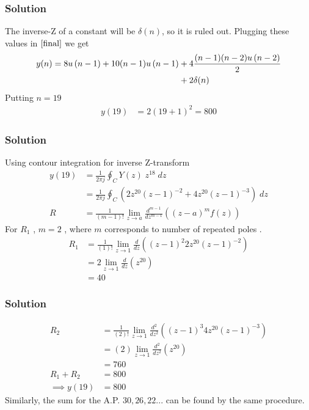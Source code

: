 \documentclass{beamer}
\providecommand{\brak}[1]{\ensuremath{\left(#1\right)}}
\theoremstyle{remark}
\begin{document}
\begin{frame}
\frametitle{Solution}
The inverse-Z of a constant will be $\delta(n)$, so it is ruled out.
Plugging these values in $\eqref{final}$ we get
\begin{align}
   y(n) = 8u\brak{n-1} + 10(n-1)u\brak{n-1} &+ 4\frac{(n-1)(n-2)u\brak{n-2}}{2} \notag \\
   &+ 2\delta(n)
\end{align}
Putting $n=19$
\begin{align}
      y(19) &= 2(19+1)^2 = 800
\end{align}
    
\end{frame}







\begin{frame}
\frametitle{Solution}
Using contour integration for inverse Z-transform
\begin{align}
    y(19)&=\frac{1}{2\pi j}\oint_{C}Y(z) \;z^{18} \;dz\\  
 &=\frac{1}{2\pi j}\oint_{C}\brak{2z^{20}\brak{z-1}^{-2}+
       4z^{20}\brak{z-1}^{-3}} \;dz\\
       R&=\frac{1}{\brak {m-1}!}\lim\limits_{z\to a}\frac{d^{m-1}}{dz^{m-1}}\brak {{(z-a)}^{m}f\brak z}\label{eq:6}  
\end{align}
For $R_1$ , $m=2$ , where $m$ corresponds to number of repeated poles .
\begin{align}
    R_1 &=\frac{1}{\brak {1}!}\lim\limits_{z\to 1}\frac{d}{dz}\brak {{(z-1)}^{2}2z^{20}\brak{z-1}^{-2}}   \\
    &=2\lim\limits_{z\to 1}\frac{d}{dz}(z^{20})   \\
    &= 40
    \end{align}
    
\end{frame}





\begin{frame}
\frametitle{Solution}
\begin{align}
    R_2 &=\frac{1}{\brak {2}!}\lim\limits_{z\to 1}\frac{d^{2}}{dz^{2}}\brak {{(z-1)}^{3}4z^{20}\brak{z-1}^{-3}}   \\
    &=\brak2\lim\limits_{z\to 1}\frac{d^2}{dz^2}(z^{20})   \\
    &= 760\\
    R_1 + R_2 &= 800\\
    \implies  y{(19)} &= 800
\end{align}
Similarly, the sum for the A.P. $30,26,22...$ can be found by the same procedure.
    
\end{frame}
\end{document}
